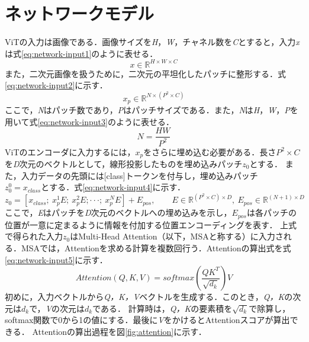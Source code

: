 \documentclass[a4paper, oneside, openany, dvipdfmx]{suribt}%
\newcommand{\fref}[1]{図\ref{#1}}
\newcommand{\eref}[1]{式\eqref{#1}}
\begin{document}
\section{ネットワークモデル}
ViTの入力は画像である．画像サイズを\textit{H}，\textit{W}，チャネル数を\textit{C}とすると，入力\textit{x}は\eref{eq:network-input1}のように表せる．
\begin{equation}
  x\in\mathbb{R}^{H\times W\times C}
  \label{eq:network-input1}
\end{equation}
また，二次元画像を扱うために，二次元の平坦化したパッチに整形する．\eref{eq:network-input2}に示す．
\begin{equation}
  x_{p}\in\mathbb{R}^{N\times(P^{2}\times C)}
  \label{eq:network-input2}
\end{equation}
ここで，\textit{N}はパッチ数であり，\textit{P}はパッチサイズである．また，\textit{N}は\textit{H}，\textit{W}，\textit{P}を用いて\eref{eq:network-input3}のように表せる．
\begin{equation}
  N=\frac{HW}{P^{2}}
  \label{eq:network-input3}
\end{equation}
ViTのエンコーダに入力するには，$x_{p}$をさらに埋め込む必要がある．長さ$P^{2}\times C$を\textit{D}次元のベクトルとして，線形投影したものを埋め込みパッチ$z_{0}$とする．
また，入力データの先頭には[class]トークンを付与し，埋め込みパッチ$z^{0}_{0}=x_{class}とする$．\eref{eq:network-input4}に示す．
\begin{equation}
  z_{0}=[x_{class};\ x^{1}_{p}E;\ x^{2}_{p}E;\cdot\cdot\cdot;\ x^{N}_{p}E]+E_{pos},\qquad E\in\mathbb{R}^{(P^{2}\times C)\times D},\ E_{pos}\in\mathbb{R}^{(N+1)\times D}
  \label{eq:network-input4}
\end{equation}
ここで，\textit{E}はパッチを\textit{D}次元のベクトルへの埋め込みを示し，$E_{pos}$は各パッチの位置が一意に定まるように情報を付加する位置エンコーディングを表す．
上式で得られた入力$z_{0}$はMulti-Head Attention（以下，MSAと称する）に入力される．MSAでは，Attentionを求める計算を複数回行う．Attentionの算出式を\eref{eq:network-input5}に示す．
\begin{equation}
  Attention(Q,K,V) = softmax(\frac{QK^{T}}{\sqrt{d_{k}}})V
  \label{eq:network-input5}
\end{equation}
初めに，入力ベクトルから\textit{Q，K，V}ベクトルを生成する．このとき，\textit{Q，K}の次元は$d_{k}$で，\textit{V}の次元は$d_{k}$である．
計算時は，\textit{Q，K}の要素積を$\sqrt{d_{k}}$で除算し，softmax関数で0から1の値にする．最後に\textit{V}をかけるとAttentionスコアが算出できる．
Attentionの算出過程を\fref{fig:attention}に示す．
\end{document}
